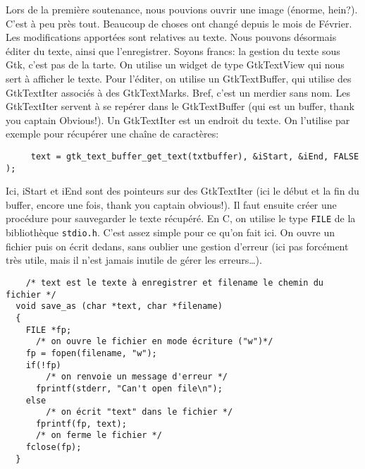 \documentclass[a4paper,10pt]{report}
\begin{document}
Lors de la premi\`ere soutenance, nous pouvions ouvrir une image (\'enorme, hein?). C'est \`a peu pr\`es tout.
Beaucoup de choses ont chang\'e depuis le mois de F\'evrier.
Les modifications apport\'ees sont relatives au texte. Nous pouvons d\'esormais \'editer du texte, ainsi que l'enregistrer. Soyons francs: la gestion du texte sous Gtk, c'est pas de la tarte. On utilise un widget de type GtkTextView qui nous sert \`a afficher le texte. Pour l'\'editer, on utilise un GtkTextBuffer, qui utilise des GtkTextIter associ\'es \`a des GtkTextMarks. Bref, c'est un merdier sans nom.
Les GtkTextIter servent \`a se rep\'erer dans le GtkTextBuffer (qui est un buffer, thank you captain Obvious!). Un GtkTextIter est un endroit du texte. On l'utilise par exemple pour r\'ecup\'erer une cha\^ine de caract\`eres:
	\begin{lstlisting}
     text = gtk_text_buffer_get_text(txtbuffer), &iStart, &iEnd, FALSE );
	\end{lstlisting}
	Ici, iStart et iEnd sont des pointeurs sur des GtkTextIter (ici le d\'ebut et la fin du buffer, encore une fois, thank you captain obvious!).
	Il faut ensuite cr\'eer une proc\'edure pour sauvegarder le texte r\'ecup\'er\'e. En C, on utilise le type \verb!FILE! de la biblioth\`eque \verb!stdio.h!. C'est assez simple pour ce qu'on fait ici. On ouvre un fichier puis on \'ecrit dedans, sans oublier une gestion d'erreur (ici pas forc\'ement tr\`es utile, mais il n'est jamais inutile de g\'erer les erreurs\ldots).
	\begin{lstlisting}
    /* text est le texte à enregistrer et filename le chemin du fichier */
  void save_as (char *text, char *filename)
  {
    FILE *fp;
      /* on ouvre le fichier en mode écriture ("w")*/
    fp = fopen(filename, "w");
    if(!fp)
        /* on renvoie un message d'erreur */
      fprintf(stderr, "Can't open file\n");
    else
        /* on écrit "text" dans le fichier */
      fprintf(fp, text);
      /* on ferme le fichier */
    fclose(fp);
  }
	\end{lstlisting}
\end{document}
